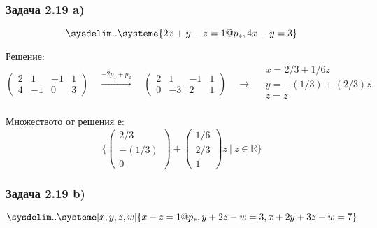 \documentclass{subfiles}
\begin{document}
\subsubsection{Задача 2.19 a)}

\begin{equation*}
    \sysdelim..\systeme{
        2x + y - z = 1@p_{*},
        4x - y = 3
    }
\end{equation*}

\noindent Решение:
\begin{equation*}
    \left(
        \begin{array}{ ccc|c }
            2 &  1 & -1 & 1\\
            4 & -1 &  0 & 3
        \end{array}
    \right)
    \quad
    \overset{-2p_{1}+p_{2}}{\longrightarrow}
    \quad
    \left(
        \begin{array}{ ccc|c }
            2 &  1 & -1 & 1\\
            0 & -3 &  2 & 1
        \end{array}
    \right)
    \quad
    \longrightarrow
    \quad
    \begin{array}{ c }
        x = 2/3 + 1/6z \\
        y = -(1/3) + (2/3)z  \\
        z = z \\
    \end{array}
\end{equation*}

\noindent Множеството от решения е:
\begin{equation*}
    \{
        \left(\begin{array}{ c } 2/3 \\ -(1/3) \\ 0 \end{array}\right) +
        \left(\begin{array}{ c } 1/6 \\ 2/3 \\ 1 \end{array}\right) z
        \ |\ z \in \mathbb{R}
    \}
\end{equation*}

\subsubsection{Задача 2.19 b)}

\begin{equation*}
    \sysdelim..\systeme[x,y,z,w]{
        x - z = 1@p_{*},
        y + 2z - w = 3,
        x + 2y + 3z - w = 7
    }
\end{equation*}
\end{document}
